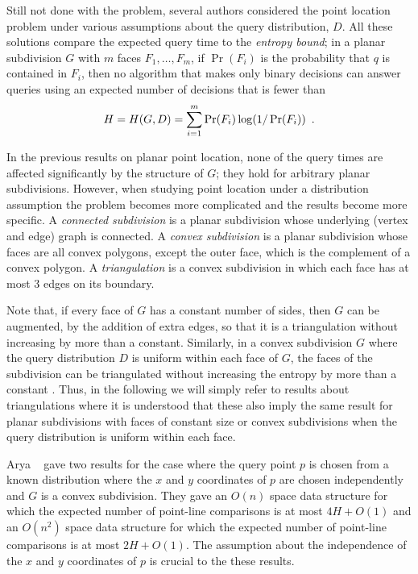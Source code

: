 \documentclass[acmtalg]{acmsmall}
\begin{document}
Still not done with the problem, several authors considered the
point location problem under various assumptions about the query
distribution, $D$.  All these solutions compare the expected query time
to the \emph{entropy bound};  in a planar subdivision $G$ with $m$ faces
$F_1,\ldots,F_m$, if $\Pr(F_i)$ is the probability that $q$ is contained
in $F_i$, then no algorithm that makes only binary decisions can answer
queries using an expected number of decisions that is fewer than
\begin{equation}
    H = H(G,D) = \sum_{i=1}^m \Pr(F_i)\log(1/\Pr(F_i)) \enspace . 
	\eqlabelx{entropy-face}
\end{equation}

In the previous results on planar point location, none of the query
times are affected significantly by the structure of $G$;  they hold
for arbitrary planar subdivisions.  However, when studying point
location under a distribution assumption the problem becomes more
complicated and the results become more specific.  A \emph{connected
subdivision} is a planar subdivision whose underlying (vertex and
edge) graph is connected.  A \emph{convex subdivision} is a planar
subdivision whose faces are all convex polygons, except the outer
face, which is the complement of a convex polygon.  A
\emph{triangulation} is a convex subdivision in which each face has at
most 3 edges on its boundary.

Note that, if every face of $G$ has a constant number of sides, then
$G$ can be augmented, by the addition of extra edges, so that it is a
triangulation without increasing  by more than a
constant.  Similarly, in a convex subdivision $G$ where the query
distribution $D$ is uniform within each face of $G$, the faces of the
subdivision can be triangulated without increasing the entropy by more
than a constant \cite{amm00}. Thus, in the following we will simply
refer to results about triangulations where it is understood that
these also imply the same result for planar subdivisions with faces of
constant size or convex subdivisions when the query distribution is
uniform within each face.

Arya \etal\ \cite{acmr00} gave two results for the case where the
query point $p$ is chosen from a known distribution where the $x$ and
$y$ coordinates of $p$ are chosen independently and $G$ is a convex
subdivision.  They gave an $O(n)$ space data structure for which the
expected number of point-line comparisons is at most $4H+O(1)$ and an
$O(n^2)$ space data structure for which the expected number of
point-line comparisons is at most $2H+O(1)$.  The assumption about the
independence of the $x$ and $y$ coordinates of $p$ is crucial to the
these results.
\end{document}
